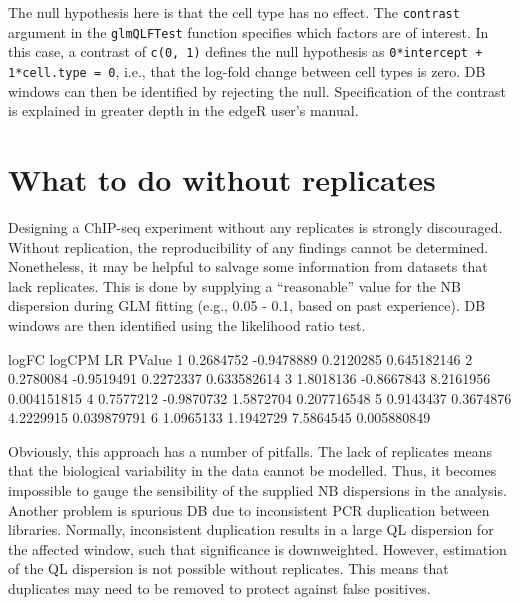 \documentclass[12pt]{report}
\renewenvironment{Schunk}{\vspace{0pt}}{\vspace{0pt}}
\newcommand{\edger}{edgeR}
\newcommand{\code}[1]{{\small\texttt{#1}}}
\begin{document}
The null hypothesis here is that the cell type has no effect. 
The \code{contrast} argument in the \code{glmQLFTest} function specifies which factors are of interest. 
In this case, a contrast of \code{c(0, 1)} defines the null hypothesis as \code{0*intercept + 1*cell.type = 0}, i.e., that the log-fold change between cell types is zero. 
DB windows can then be identified by rejecting the null. 
Specification of the contrast is explained in greater depth in the \edger{} user's manual. 

\section{What to do without replicates}
Designing a ChIP-seq experiment without any replicates is strongly discouraged.
Without replication, the reproducibility of any findings cannot be determined. 
Nonetheless, it may be helpful to salvage some information from datasets that lack replicates.
This is done by supplying a ``reasonable'' value for the NB dispersion during GLM fitting (e.g., 0.05 - 0.1, based on past experience).
DB windows are then identified using the likelihood ratio test.

\begin{Schunk}
\begin{Soutput}
      logFC     logCPM        LR      PValue
1 0.2684752 -0.9478889 0.2120285 0.645182146
2 0.2780084 -0.9519491 0.2272337 0.633582614
3 1.8018136 -0.8667843 8.2161956 0.004151815
4 0.7577212 -0.9870732 1.5872704 0.207716548
5 0.9143437  0.3674876 4.2229915 0.039879791
6 1.0965133  1.1942729 7.5864545 0.005880849
\end{Soutput}
\end{Schunk}

Obviously, this approach has a number of pitfalls. 
The lack of replicates means that the biological variability in the data cannot be modelled.
Thus, it becomes impossible to gauge the sensibility of the supplied NB dispersions in the analysis.
Another problem is spurious DB due to inconsistent PCR duplication between libraries.
Normally, inconsistent duplication results in a large QL dispersion for the affected window, such that significance is downweighted.
However, estimation of the QL dispersion is not possible without replicates.
This means that duplicates may need to be removed to protect against false positives.
\end{document}
